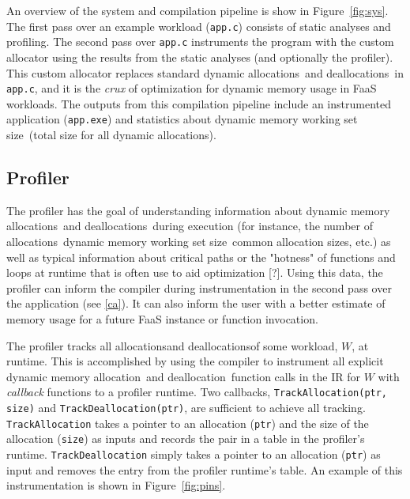 \documentclass{article}
\def\ALL{allocation}
\def\DALL{deallocation}
\def\ALLS{allocations}
\def\DALLS{deallocations}
\def\DWS{dynamic memory working set size}
\begin{document}
An overview of the system and compilation pipeline is show in Figure~\ref{fig:sys}. The 
first pass over an example workload (\texttt{app.c}) consists of static analyses and 
profiling. The second pass over \texttt{app.c} instruments the program with the custom
allocator using the results from the static analyses (and optionally the profiler). This 
custom allocator replaces standard dynamic \ALLS\ and \DALLS\ in \texttt{app.c}, and it is
the \textit{crux} of optimization for dynamic memory usage in FaaS workloads. The
outputs from this compilation pipeline include an instrumented application (\texttt{app.exe})
and statistics about \DWS\ (total size for all dynamic \ALLS).

\subsection{Profiler}
The profiler has the goal of understanding information about dynamic memory \ALLS\ and 
\DALLS\ during execution (for instance, the number of \ALLS\, \DWS\, common \ALL 
sizes, etc.) as well as typical information about critical paths or the "hotness" of functions and
loops at runtime that is often use to aid optimization [?]. Using this data, the profiler can inform the compiler during 
instrumentation in the second pass over the application (see \ref{ca}). It can also 
inform the user with a better estimate of memory usage for a future FaaS instance or 
function invocation.

The profiler tracks all \ALLS and \DALLS of some workload, $W$, at runtime. This is 
accomplished by using the compiler to instrument all explicit dynamic memory \ALL\ and \DALL\ function 
calls in the IR for $W$ with \textit{callback} functions to a profiler runtime.
Two callbacks, \texttt{TrackAllocation(ptr, size)} and \texttt{TrackDeallocation(ptr)}, are 
sufficient to achieve all tracking. \texttt{TrackAllocation} takes a pointer to an allocation (\texttt{ptr}) and 
the size of the allocation (\texttt{size}) as inputs and records the pair in a table in the 
profiler's runtime. \texttt{TrackDeallocation} simply takes a pointer to an allocation (\texttt{ptr}) as
input and removes the entry from the profiler runtime's table. An example of this 
instrumentation is shown in Figure~\ref{fig:pins}.
\end{document}
